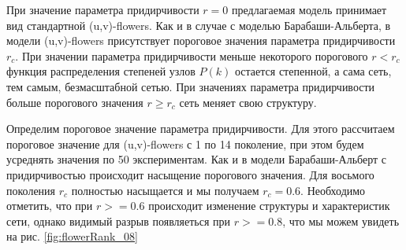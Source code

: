 \documentclass[10pt,aps,pra]{revtex4-1}
\begin{document}
При значение параметра придирчивости $r=0$ предлагаемая модель принимает вид стандартной (u,v)-flowers. Как и в случае с моделью Барабаши-Альберта, в модели (u,v)-flowers присутствует пороговое значения параметра придирчивости $r_c$. При значении параметра придирчивости меньше некоторого порогового $r<r_c$ функция распределения степеней узлов $P(k)$ остается степенной, а сама сеть, тем самым, безмасштабной сетью. При значениях параметра придирчивости больше порогового значения $r \geq r_c$ сеть меняет свою структуру. 

Определим пороговое значение параметра придирчивости. Для этого рассчитаем пороговое значение для (u,v)-flowers с 1 по 14 поколение, при этом будем усреднять значения по 50 экспериментам. Как и в модели Барабаши-Альберт с придирчивостью происходит насыщение порогового значения. Для восьмого поколения $r_c$ полностью насыщается и мы получаем $r_c=0.6$. Необходимо отметить, что при $r>=0.6$ происходит изменение структуры и характеристик сети, однако видимый разрыв появляеться при $r>=0.8$, что мы можем увидеть на рис. \ref{fig:flowerRank_08}
\end{document}
